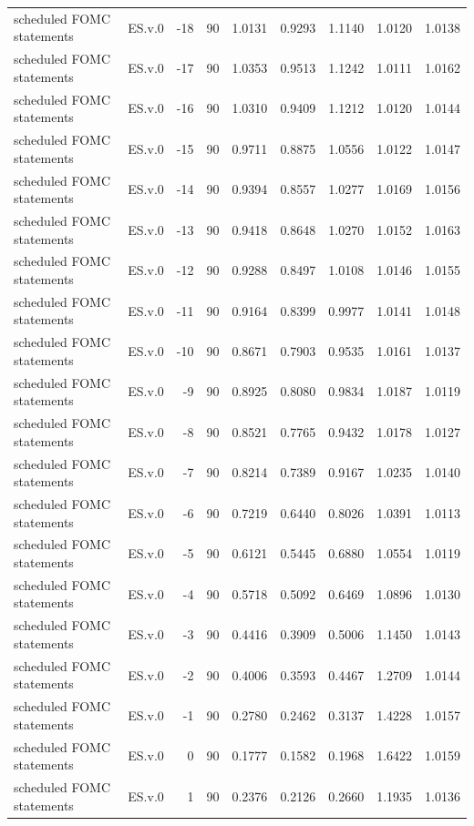 \begin{tabular}{llrrrrrrr}
scheduled FOMC statements & ES.v.0 & -18 & 90 & 1.0131 & 0.9293 & 1.1140 & 1.0120 & 1.0138 \\
scheduled FOMC statements & ES.v.0 & -17 & 90 & 1.0353 & 0.9513 & 1.1242 & 1.0111 & 1.0162 \\
scheduled FOMC statements & ES.v.0 & -16 & 90 & 1.0310 & 0.9409 & 1.1212 & 1.0120 & 1.0144 \\
scheduled FOMC statements & ES.v.0 & -15 & 90 & 0.9711 & 0.8875 & 1.0556 & 1.0122 & 1.0147 \\
scheduled FOMC statements & ES.v.0 & -14 & 90 & 0.9394 & 0.8557 & 1.0277 & 1.0169 & 1.0156 \\
scheduled FOMC statements & ES.v.0 & -13 & 90 & 0.9418 & 0.8648 & 1.0270 & 1.0152 & 1.0163 \\
scheduled FOMC statements & ES.v.0 & -12 & 90 & 0.9288 & 0.8497 & 1.0108 & 1.0146 & 1.0155 \\
scheduled FOMC statements & ES.v.0 & -11 & 90 & 0.9164 & 0.8399 & 0.9977 & 1.0141 & 1.0148 \\
scheduled FOMC statements & ES.v.0 & -10 & 90 & 0.8671 & 0.7903 & 0.9535 & 1.0161 & 1.0137 \\
scheduled FOMC statements & ES.v.0 & -9 & 90 & 0.8925 & 0.8080 & 0.9834 & 1.0187 & 1.0119 \\
scheduled FOMC statements & ES.v.0 & -8 & 90 & 0.8521 & 0.7765 & 0.9432 & 1.0178 & 1.0127 \\
scheduled FOMC statements & ES.v.0 & -7 & 90 & 0.8214 & 0.7389 & 0.9167 & 1.0235 & 1.0140 \\
scheduled FOMC statements & ES.v.0 & -6 & 90 & 0.7219 & 0.6440 & 0.8026 & 1.0391 & 1.0113 \\
scheduled FOMC statements & ES.v.0 & -5 & 90 & 0.6121 & 0.5445 & 0.6880 & 1.0554 & 1.0119 \\
scheduled FOMC statements & ES.v.0 & -4 & 90 & 0.5718 & 0.5092 & 0.6469 & 1.0896 & 1.0130 \\
scheduled FOMC statements & ES.v.0 & -3 & 90 & 0.4416 & 0.3909 & 0.5006 & 1.1450 & 1.0143 \\
scheduled FOMC statements & ES.v.0 & -2 & 90 & 0.4006 & 0.3593 & 0.4467 & 1.2709 & 1.0144 \\
scheduled FOMC statements & ES.v.0 & -1 & 90 & 0.2780 & 0.2462 & 0.3137 & 1.4228 & 1.0157 \\
scheduled FOMC statements & ES.v.0 & 0 & 90 & 0.1777 & 0.1582 & 0.1968 & 1.6422 & 1.0159 \\
scheduled FOMC statements & ES.v.0 & 1 & 90 & 0.2376 & 0.2126 & 0.2660 & 1.1935 & 1.0136 \\

\end{tabular}
